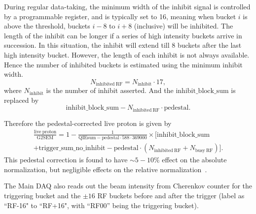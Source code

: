 \documentclass[../main.tex]{subfiles}
\begin{document}
During regular data-taking, the minimum width of the inhibit signal is controlled by a programmable
register, and is typically set to 16, meaning when bucket $i$ is above the threshold, buckets $i-8$
to $i+8$ (inclusive) will be inhibited. The length of the inhibit can be longer if a series
of high intensity buckets arrive in succession. In this situation, the inhibit will extend till 8
buckets after the last high intensity bucket. However, the length of each inhibit is not always available.
Hence the number of inhibited buckets is estimated using the minimum inhibit width.
\begin{equation}
	N_{\mathrm{inhibited\ RF}}=N_{\mathrm{inhibit}}\cdot 17,
\end{equation}
where $N_{\mathrm{inhibit}}$ is the number of inhibit asserted.
And the $\mathrm{inhibit\_block\_sum}$ is replaced by
\begin{equation}
	\mathrm{inhibit\_block\_sum}-N_{\mathrm{inhibited\ RF}}\cdot\mathrm{pedestal}.
\end{equation}

Therefore the pedestal-corrected live proton is given by
\begin{multline}
	\frac{\mathrm{live\ proton}}{\mathrm{G2SEM}}= 1-\frac{1}{\mathrm{QIEsum}-\mathrm{pedestal}\cdot 588\cdot 369000}\times\big[\mathrm{inhibit\_block\_sum}\\
		+\mathrm{trigger\_sum\_no\_inhibit}-\mathrm{pedestal}\cdot\left(N_{\mathrm{inhibited\ RF}}+N_{\mathrm{busy\ RF}}\right)\big].
	\label{eq:livePoT-new}
\end{multline}
This pedestal correction is found to have $\sim 5-10\%$ effect on the absolute normalization,
but negligible effects on the relative normalization~\cite{chleung-10679}.


The Main DAQ also reads out the beam intensity from Cherenkov counter for the triggering bucket
and the $\pm16$ RF buckets before and after the trigger (label as ``RF-16" to ``RF+16", with
``RF00'' being the triggering bucket).
\end{document}
